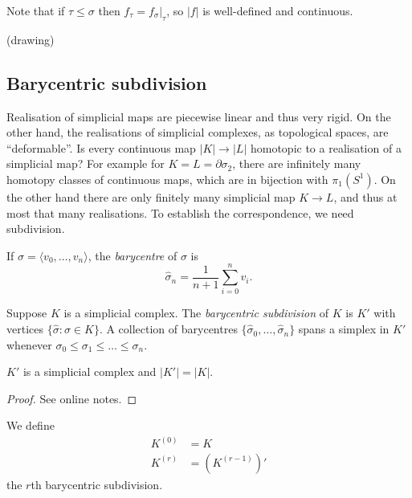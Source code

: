 \documentclass[a4paper]{article}
\renewcommand{\b}{\partial} %
\begin{document}
Note that if \(\tau \leq \sigma\) then \(f_\tau = f_\sigma|_\tau\), so \(|f|\) is well-defined and continuous.
\begin{eg}
  (drawing)
\end{eg}

\subsection{Barycentric subdivision}

Realisation of simplicial maps are piecewise linear and thus very rigid. On the other hand, the realisations of simplicial complexes, as topological spaces, are ``deformable''. Is every continuous map \(|K| \to |L|\) homotopic to a realisation of a simplicial map? For example for \(K = L = \b \sigma_2\), there are infinitely many homotopy classes of continuous maps, which are in bijection with \(\pi_1(S^1)\). On the other hand there are only finitely many simplicial map \(K \to L\), and thus at most that many realisations. To establish the correspondence, we need subdivision.

\begin{definition}[barycentre]
  If \(\sigma = \langle v_0, \dots, v_n \rangle\), the \emph{barycentre} of \(\sigma\) is
  \[
    \hat \sigma_n = \frac{1}{n + 1} \sum_{i = 0}^n v_i.
  \]
\end{definition}

\begin{definition}
  Suppose \(K\) is a simplicial complex. The \emph{barycentric subdivision} of \(K\) is \(K'\) with vertices \(\{\hat \sigma: \sigma \in K\}\). A collection of barycentres \(\{\hat \sigma_0, \dots, \hat \sigma_n\}\) spans a simplex in \(K'\) whenever \(\sigma_0 \leq \sigma_1 \leq \dots \leq \sigma_n\).
\end{definition}

\begin{lemma}
  \(K'\) is a simplicial complex and \(|K'| = |K|\).
\end{lemma}

\begin{proof}
  See online notes.
\end{proof}

\begin{definition}
  We define
  \begin{align*}
    K^{(0)} &= K \\
    K^{(r)} &= (K^{(r - 1)})'
  \end{align*}
  the \(r\)th barycentric subdivision.
\end{definition}
\end{document}
